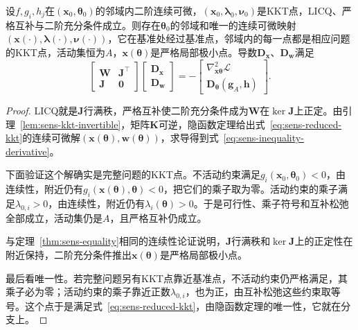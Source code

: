 \begin{theorem}[不等式约束极小解的导数]
\label{thm:sens-inequality}
设$f,g_i,h_j$在$(\bm{x}_0,\bm{\theta}_0)$的邻域内二阶连续可微，$(\bm{x}_0,\bm{\lambda}_0,\bm{\nu}_0)$是KKT点，LICQ、严格互补与二阶充分条件成立。则存在$\bm{\theta}_0$的邻域和唯一的连续可微映射$(\bm{x}(\cdot),\bm{\lambda}(\cdot),\bm{\nu}(\cdot))$，它在基准处经过基准点，邻域内的每一点都是相应问题的KKT点，活动集恒为$A$，$\bm{x}(\bm{\theta})$是严格局部极小点。导数$\bm{D}_{\bm{x}}$、$\bm{D}_{\bm{w}}$满足
\begin{equation}
 \begin{bmatrix}\bm{W}&\bm{J}^{\top}\\\bm{J}&\bm{0}\end{bmatrix}
 \begin{bmatrix}\bm{D}_{\bm{x}}\\\bm{D}_{\bm{w}}\end{bmatrix}
 =-\begin{bmatrix}\nabla^2_{\bm{x}\bm{\theta}}\mathcal{L}\\\bm{D}_{\bm{\theta}}(\bm{g}_A,\bm{h})\end{bmatrix}.
 \label{eq:sens-inequality-derivative}
\end{equation}
\end{theorem}

\begin{proof}
LICQ就是$\bm{J}$行满秩，严格互补使二阶充分条件成为$\bm{W}$在$\ker\bm{J}$上正定。由引理~\ref{lem:sens-kkt-invertible}，矩阵$\bm{K}$可逆，隐函数定理给出式~\eqref{eq:sens-reduced-kkt}的连续可微解$(\bm{x}(\bm{\theta}),\bm{w}(\bm{\theta}))$，求导得到式~\eqref{eq:sens-inequality-derivative}。

下面验证这个解确实是完整问题的KKT点。不活动约束满足$g_i(\bm{x}_0,\bm{\theta}_0)<0$，由连续性，附近仍有$g_i(\bm{x}(\bm{\theta}),\bm{\theta})<0$，把它们的乘子取为零。活动约束的乘子满足$\lambda_{0,i}>0$，由连续性，附近仍有$\lambda_i(\bm{\theta})>0$。于是可行性、乘子符号和互补松弛全部成立，活动集仍是$A$，且严格互补仍成立。

与定理~\ref{thm:sens-equality}相同的连续性论证说明，$\bm{J}$行满秩和$\ker\bm{J}$上的正定性在附近保持，二阶充分条件推出$\bm{x}(\bm{\theta})$是严格局部极小点。

最后看唯一性。若完整问题另有KKT点靠近基准点，不活动约束仍严格满足，其乘子必为零；活动约束的乘子靠近正数$\lambda_{0,i}$，也为正，由互补松弛这些约束取等号。这个点于是满足式~\eqref{eq:sens-reduced-kkt}，由隐函数定理的唯一性，它就在分支上。
\end{proof}

